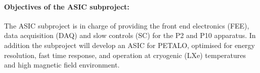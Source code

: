 \paragraph{Objectives of the ASIC subproject:}
The ASIC subproject is in charge of providing the front end electronics (FEE), data acquisition (DAQ) and slow controls (SC) for the P2 and P10 apparatus.  In addition the subproject will develop an ASIC for PETALO, optimised for energy resolution, fast time response, and operation at cryogenic (LXe) temperatures and high magnetic field environment.

%
%
%
%
%
%
%

